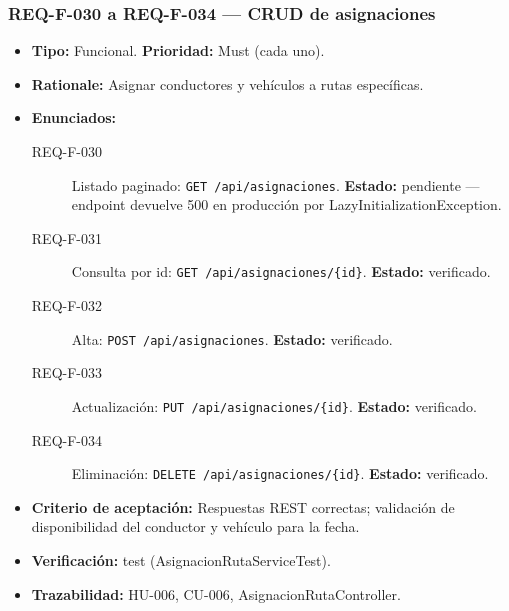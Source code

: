 \documentclass[12pt,a4paper]{article}
\begin{document}
\subsubsection{REQ-F-030 a REQ-F-034 --- CRUD de asignaciones}
\begin{itemize}
  \item \textbf{Tipo:} Funcional. \textbf{Prioridad:} Must (cada uno).
  \item \textbf{Rationale:} Asignar conductores y vehículos a rutas específicas.
  \item \textbf{Enunciados:}
    \begin{description}
      \item[REQ-F-030] Listado paginado: \texttt{GET /api/asignaciones}. \textbf{Estado:} pendiente --- endpoint devuelve 500 en producción por LazyInitializationException.
      \item[REQ-F-031] Consulta por id: \texttt{GET /api/asignaciones/\{id\}}. \textbf{Estado:} verificado.
      \item[REQ-F-032] Alta: \texttt{POST /api/asignaciones}. \textbf{Estado:} verificado.
      \item[REQ-F-033] Actualización: \texttt{PUT /api/asignaciones/\{id\}}. \textbf{Estado:} verificado.
      \item[REQ-F-034] Eliminación: \texttt{DELETE /api/asignaciones/\{id\}}. \textbf{Estado:} verificado.
    \end{description}
  \item \textbf{Criterio de aceptación:} Respuestas REST correctas; validación de disponibilidad del conductor y vehículo para la fecha.
  \item \textbf{Verificación:} test (AsignacionRutaServiceTest).
  \item \textbf{Trazabilidad:} HU-006, CU-006, AsignacionRutaController.
\end{itemize}

\end{document}
